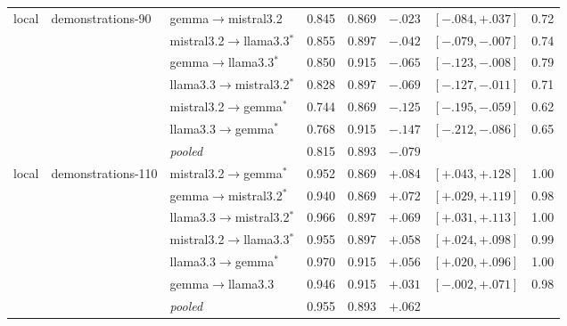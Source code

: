 {\begin{longtable}{lllrlrrr}
\addlinespace
local & demonstrations-90 & gemma$\to$mistral3.2 & 0.845 & 0.869 & $-.023$ & $[-.084,+.037]$ & 0.72 \\*
 &  & mistral3.2$\to$llama3.3$^{*}$ & 0.855 & 0.897 & $-.042$ & $[-.079,-.007]$ & 0.74 \\*
 &  & gemma$\to$llama3.3$^{*}$ & 0.850 & 0.915 & $-.065$ & $[-.123,-.008]$ & 0.79 \\*
 &  & llama3.3$\to$mistral3.2$^{*}$ & 0.828 & 0.897 & $-.069$ & $[-.127,-.011]$ & 0.71 \\*
 &  & mistral3.2$\to$gemma$^{*}$ & 0.744 & 0.869 & $-.125$ & $[-.195,-.059]$ & 0.62 \\*
 &  & llama3.3$\to$gemma$^{*}$ & 0.768 & 0.915 & $-.147$ & $[-.212,-.086]$ & 0.65 \\*
 & & \emph{pooled} & 0.815 & 0.893 & $-.079$ & & \\
\addlinespace
local & demonstrations-110 & mistral3.2$\to$gemma$^{*}$ & 0.952 & 0.869 & $+.084$ & $[+.043,+.128]$ & 1.00 \\*
 &  & gemma$\to$mistral3.2$^{*}$ & 0.940 & 0.869 & $+.072$ & $[+.029,+.119]$ & 0.98 \\*
 &  & llama3.3$\to$mistral3.2$^{*}$ & 0.966 & 0.897 & $+.069$ & $[+.031,+.113]$ & 1.00 \\*
 &  & mistral3.2$\to$llama3.3$^{*}$ & 0.955 & 0.897 & $+.058$ & $[+.024,+.098]$ & 0.99 \\*
 &  & llama3.3$\to$gemma$^{*}$ & 0.970 & 0.915 & $+.056$ & $[+.020,+.096]$ & 1.00 \\*
 &  & gemma$\to$llama3.3 & 0.946 & 0.915 & $+.031$ & $[-.002,+.071]$ & 0.98 \\*
 & & \emph{pooled} & 0.955 & 0.893 & $+.062$ & & \\
\end{longtable}}
